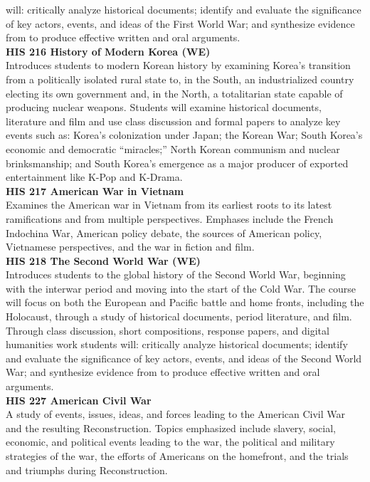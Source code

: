 \documentclass[
  letterpaper,
]{scrbook}
\begin{document}
will: critically analyze historical documents; identify and evaluate the
significance of key actors, events, and ideas of the First World War;
and synthesize evidence from to produce effective written and oral
arguments.\\
\textbf{HIS 216 History of Modern Korea (WE)}\\
Introduces students to modern Korean history by examining Korea's
transition from a politically isolated rural state to, in the South, an
industrialized country electing its own government and, in the North, a
totalitarian state capable of producing nuclear weapons. Students will
examine historical documents, literature and film and use class
discussion and formal papers to analyze key events such as: Korea's
colonization under Japan; the Korean War; South Korea's economic and
democratic ``miracles;'' North Korean communism and nuclear
brinksmanship; and South Korea's emergence as a major producer of
exported entertainment like K-Pop and K-Drama.\\
\textbf{HIS 217 American War in Vietnam}\\
Examines the American war in Vietnam from its earliest roots to its
latest ramifications and from multiple perspectives. Emphases include
the French Indochina War, American policy debate, the sources of
American policy, Vietnamese perspectives, and the war in fiction and
film.\\
\textbf{HIS 218 The Second World War (WE)}\\
Introduces students to the global history of the Second World War,
beginning with the interwar period and moving into the start of the Cold
War. The course will focus on both the European and Pacific battle and
home fronts, including the Holocaust, through a study of historical
documents, period literature, and film. Through class discussion, short
compositions, response papers, and digital humanities work students
will: critically analyze historical documents; identify and evaluate the
significance of key actors, events, and ideas of the Second World War;
and synthesize evidence from to produce effective written and oral
arguments.\\
\textbf{HIS 227 American Civil War}\\
A study of events, issues, ideas, and forces leading to the American
Civil War and the resulting Reconstruction. Topics emphasized include
slavery, social, economic, and political events leading to the war, the
political and military strategies of the war, the efforts of Americans
on the homefront, and the trials and triumphs during Reconstruction.\\
\end{document}
